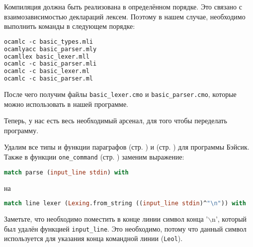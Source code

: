 Компиляция должна быть реализована в определённом порядке. Это связано с
взаимозависимостью деклараций лексем. Поэтому в нашем случае, необходимо
выполнить команды в следующем порядке:

\begin{lstlisting}[language=Caml]
ocamlc -c basic_types.mli
ocamlyacc basic_parser.mly
ocamllex basic_lexer.mll
ocamlc -c basic_parser.mli
ocamlc -c basic_lexer.ml
ocamlc -c basic_parser.ml
\end{lstlisting}

После чего получим файлы \texttt{basic\_lexer.cmo} и \texttt{basic\_parser.cmo},
которые можно использовать в нашей программе.

Теперь, у нас есть весь необходимый арсенал, для того чтобы переделать
программу.

Удалим все типы и функции параграфов  (стр.
\pageref{??}) и  (стр. \pageref{??}) для программы
Бэйсик. Также в функции \texttt{one\_command} (стр. \pageref{??}) заменим
выражение:

\begin{lstlisting}[language=Caml]
match parse (input_line stdin) with
\end{lstlisting}

на

\begin{lstlisting}[language=Caml]
match line lexer (Lexing.from_string ((input_line stdin)^"\n")) with
\end{lstlisting}

Заметьте, что необходимо поместить в конце линии символ конца '$\backslash$n',
который был удалён функцией \texttt{input\_line}. Это необходимо, потому что
данный символ используется для указания конца командной линии (\texttt{Leol}).